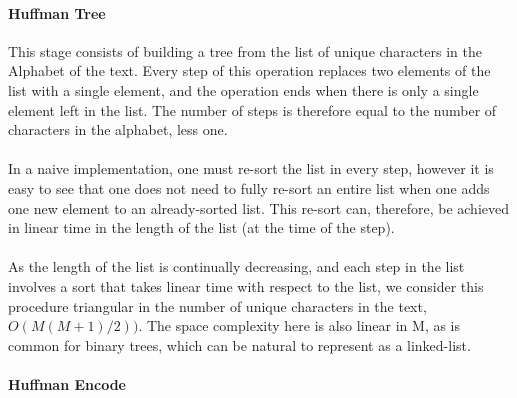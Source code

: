 \documentclass[paper=a4, fontsize=10pt]{article} %
\numberwithin{equation}{section} %
\numberwithin{figure}{section} %
\numberwithin{table}{section} %
\begin{document}
\paragraph{Huffman Tree}
This stage consists of building a tree from the list of unique characters in the Alphabet of the text. Every step of this operation replaces two elements of the list with a single element, and the operation ends when there is only a single element left in the list. The number of steps is therefore equal to the number of characters in the alphabet, less one.
\\
\\
In a naive implementation, one must re-sort the list in every step, however it is easy to see that one does not need to fully re-sort an entire list when one adds one new element to an already-sorted list. This re-sort can, therefore, be achieved in linear time in the length of the list (at the time of the step).
\\
\\
As the length of the list is continually decreasing, and each step in the list involves a sort that takes linear time with respect to the list, we consider this procedure triangular in the number of unique characters in the text,  $O(M (M+1)/2))$. The space complexity here is also linear in M, as is common for binary trees, which can be natural to represent as a linked-list.


\paragraph{Huffman Encode}
\end{document}

